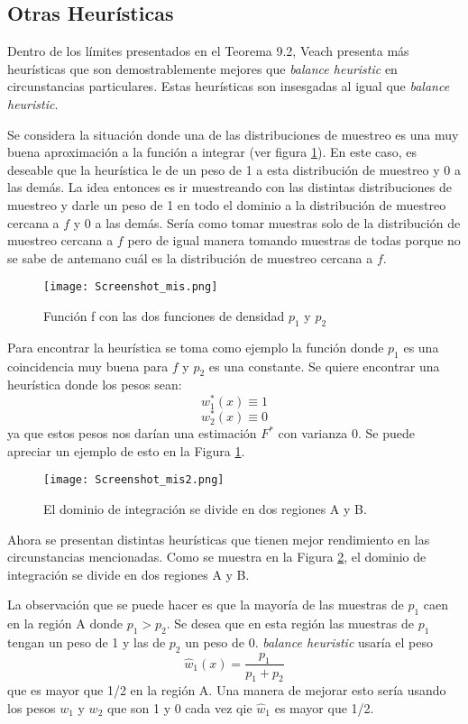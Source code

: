 \documentclass{article}
\begin{document}
\subsection{Otras Heurísticas}

Dentro de los límites presentados en el Teorema 9.2, Veach presenta más heurísticas que son demostrablemente mejores que \textit{balance heuristic} en circunstancias particulares.
Estas heurísticas son insesgadas al igual que \textit{balance heuristic}.

Se considera la situación donde una de las distribuciones de muestreo es una muy buena aproximación a la función a integrar (ver figura \ref{fig:misother}).
En este caso, es deseable que la heurística le de un peso de 1 a esta distribución de muestreo y 0 a las demás.
La idea entonces es ir muestreando con las distintas distribuciones de muestreo y darle un peso de 1 en todo el dominio a la distribución de muestreo cercana a $f$ y 0 a las demás.
Sería como tomar muestras solo de la distribución de muestreo cercana a $f$ pero de igual manera tomando muestras de todas porque no se sabe de antemano cuál es la distribución de muestreo cercana a $f$.

\begin{figure}[H]
\centering
\texttt{[image: Screenshot\_mis.png]}
\caption{Función f con las dos funciones de densidad $p_{1}$ y $p_{2}$}
\label{fig:misother}
\end{figure}

Para encontrar la heurística se toma como ejemplo la función donde $p_{1}$ es una coincidencia muy buena para $f$ y $p_{2}$ es una constante.
Se quiere encontrar una heurística donde los pesos sean:
$$w^{*}_{1}(x) \equiv 1$$
$$w^{*}_{2}(x) \equiv 0$$
ya que estos pesos nos darían una estimación $F^{*}$ con varianza 0.
Se puede apreciar un ejemplo de esto en la Figura \ref{fig:misother}.

\begin{figure}[H]
\centering
\texttt{[image: Screenshot\_mis2.png]}
\caption{El dominio de integración se divide en dos regiones A y B.}
\label{fig:misother2}
\end{figure}

Ahora se presentan distintas heurísticas que tienen mejor rendimiento en las circunstancias mencionadas.
Como se muestra en la Figura \ref{fig:misother2}, el dominio de integración se divide en dos regiones A y B.

La observación que se puede hacer es que la mayoría de las muestras de $p_{1}$ caen en la región A donde $p_{1} > p_{2}$.
Se desea que en esta región las muestras de $p_{1}$ tengan un peso de 1 y las de $p_{2}$ un peso de 0.
\textit{balance heuristic} usaría el peso
$$ \hat{w}_{1}(x) = \frac{p_1}{p_1 + p_2} $$
que es mayor que 1/2 en la región A. Una manera de mejorar esto sería usando los pesos $w_{1}$ y $w_{2}$ que son 1 y 0 cada vez qie $\hat{w}_{1}$ es mayor que 1/2.
\end{document}
